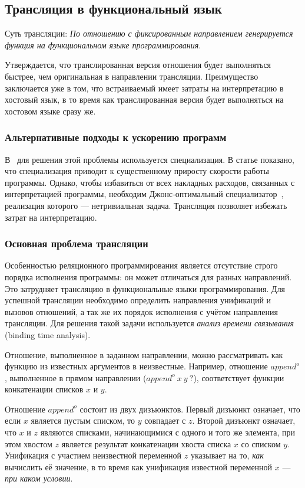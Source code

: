 \subsection{Трансляция в функциональный язык}

Суть трансляции:
\emph{По отношению с фиксированным направлением генерируется функция на функциональном языке программирования}.

Утверждается, что транслированная версия отношения будет выполняться быстрее, чем оригинальная в направлении трансляции.
Преимущество заключается уже в том, что встраиваемый \miniKanren{} имеет затраты на интерпретацию в хостовый язык, в то время как транслированная версия будет выполняться на хостовом языке сразу же.

\subsubsection{Альтернативные подходы к ускорению программ}

В~\cite{lozov2019relational} для решения этой проблемы используется специализация. 
В статье показано, что специализация приводит к существенному приросту скорости работы программы.
Однако, чтобы избавиться от всех накладных расходов, связанных с интерпретацией программы, необходим Джонс-оптимальный специализатор~\cite{jones1993partial}, реализация которого --- нетривиальная задача.
Трансляция позволяет избежать затрат на интерпретацию.

\subsubsection{Основная проблема трансляции}

Особенностью реляционного программирования является отсутствие строго порядка исполнения программы: он может отличаться для разных направлений.
Это затрудняет трансляцию в функциональные языки программирования.
Для успешной трансляции необходимо определить направления унификаций и вызовов отношений, а так же их порядок исполнения с учётом направления трансляции. 
Для решения такой задачи используется \textit{анализ времени связывания} (binding time analysis). 

Отношение, выполненное в заданном направлении, можно рассматривать как функцию из известных аргументов в неизвестные. 
Например, отношение $append^o$, выполненное в прямом направлении ($append^o \ x \ y \ ?$), соответствует функции конкатенации списков $x$ и $y$. 

Отношение $append^o$ состоит из двух дизъюнктов. 
Первый дизъюнкт означает, что если $x$ является пустым списком, то $y$ совпадает с $z$. 
Второй дизъюнкт означает, что $x$ и $z$ являются списками, начинающимися с одного и того же элемента, при этом хвостом $z$ является результат конкатенации хвоста списка $x$ со списком $y$. 
Унификация с участием неизвестной переменной $z$ указывает на то, \emph{как} вычислить её значение, в то время как унификация известной переменной $x$ --- \emph{при каком условии}.

